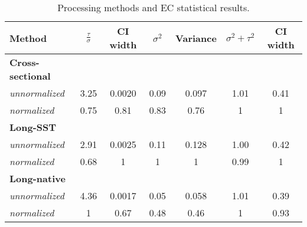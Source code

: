 
\begin{table}[h!]
\centering
\caption{Processing methods and EC statistical results.}
\begin{tabular*}{130mm}{@{\extracolsep{\fill}} lcc|cc|cc}
\hline
Method & $\frac{\tau}{\sigma}$ & CI width& $\sigma^2$ & Variance& $\sigma^2 + \tau^2$ & CI width \\
\hline
\bf{Cross-sectional} &&&&&& \\
\quad \emph{unnormalized} & 3.25 & 0.0020  & 0.09 & 0.097 & \cellcolor{red}1.01 &0.41  \\
\quad \emph{normalized}   & 0.75 & 0.81 & 0.83 & 0.76 & \cellcolor{red} 1 & 1 \\
\bf{Long-SST} &&&&&& \\
\quad \emph{unnormalized}  & \cellcolor{red} 2.91 & \cellcolor{red} 0.0025 & \cellcolor{red} 0.11 &\cellcolor{red} 0.128 & \cellcolor{green} 1.00 & \cellcolor{red} 0.42 \\
\quad \emph{normalized}   & \cellcolor{red} 0.68 & \cellcolor{red} 1 &\cellcolor{red} 1 &\cellcolor{red} 1 & \cellcolor{green} 0.99 & \cellcolor{red} 1 \\
\bf{Long-native} &&&&&& \\
 \quad \emph{unnormalized}  & \cellcolor{green} 4.36 & \cellcolor{green} 0.0017 & \cellcolor{green} 0.05 & \cellcolor{green} 0.058 & \cellcolor{red} 1.01 & \cellcolor{green} 0.39 \\
 \quad \emph{normalized}   & \cellcolor{green} 1 & \cellcolor{green} 0.67 & \cellcolor{green} 0.48 & \cellcolor{green} 0.46 & \cellcolor{red} 1 &  \cellcolor{green} 0.93 \\
\hline
\end{tabular*}
\label{table:res_tab}
\end{table}
